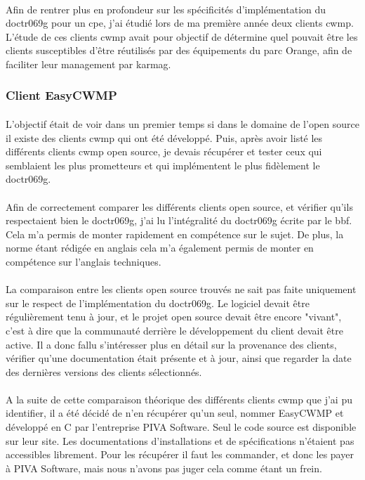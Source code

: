\documentclass[12pt,a4paper]{report}
\begin{document}
\paragraph*{}Afin de rentrer plus en profondeur sur les spécificités d'implémentation du \gls{doctr069g} pour un \gls{cpe}, j'ai étudié lors de ma première année deux clients \gls{cwmp}. L'étude de ces clients \gls{cwmp} avait pour objectif de détermine quel pouvait être les clients susceptibles d'être réutilisés par des équipements du parc Orange, afin de faciliter leur management par \gls{karmag}. \\
\subsubsection{Client EasyCWMP}
\paragraph*{}L’objectif était de voir dans un premier temps si dans le domaine de l’open source il existe des clients \gls{cwmp} qui ont été développé. Puis, après avoir listé les différents clients \gls{cwmp} open source, je devais récupérer et tester ceux qui semblaient les plus prometteurs et qui implémentent le plus fidèlement le \gls{doctr069g}.
\paragraph*{}Afin de correctement comparer les différents clients open source, et vérifier qu’ils respectaient bien le \gls{doctr069g}, j’ai lu l’intégralité du \gls{doctr069g} écrite par le \gls{bbf}. Cela m’a permis de monter rapidement en compétence sur le sujet. De plus, la norme étant rédigée en anglais cela m’a également permis de monter en compétence sur l'anglais techniques.
\paragraph*{}La comparaison entre les clients open source trouvés ne sait pas faite uniquement sur le respect de l'implémentation du \gls{doctr069g}. Le logiciel devait être régulièrement tenu à jour, et le projet open source devait être encore "vivant", c'est à dire que la communauté derrière le développement du client devait être active. Il a donc fallu s'intéresser plus en détail sur la provenance des clients, vérifier qu'une documentation était présente et à jour, ainsi que regarder la date des dernières versions des clients sélectionnés.
\paragraph*{}A la suite de cette comparaison théorique des différents clients \gls{cwmp} que j’ai pu identifier, il a été décidé de n’en récupérer qu’un seul, nommer EasyCWMP et développé en C par l’entreprise PIVA Software. Seul le code source est disponible sur leur site. Les documentations d’installations et de spécifications n’étaient pas accessibles librement. Pour les récupérer il faut les commander, et donc les payer à PIVA Software, mais nous n'avons pas juger cela comme étant un frein.
\end{document}
